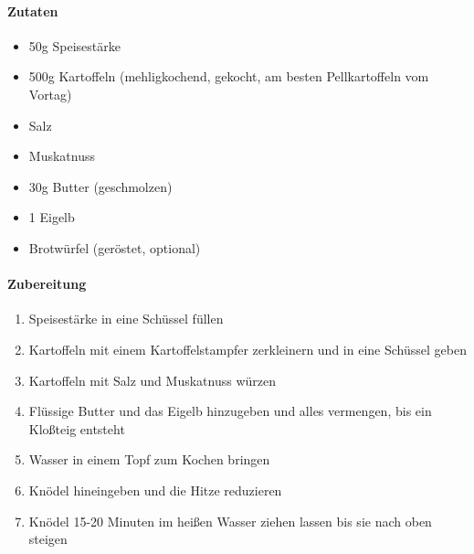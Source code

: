 \newpage
{}

\paragraph{Zutaten}
\begin{itemize}[noitemsep]
	\item  50g Speisestärke
	\item 500g Kartoffeln (mehligkochend, gekocht, am besten Pellkartoffeln vom Vortag)
	\item Salz
	\item Muskatnuss
	\item 30g Butter (geschmolzen)
	\item 1 Eigelb
	\item Brotwürfel (geröstet, optional)
\end{itemize}

\paragraph{Zubereitung}
\begin{enumerate}[noitemsep]
	\item Speisestärke in eine Schüssel füllen
	\item Kartoffeln mit einem Kartoffelstampfer zerkleinern und in eine Schüssel geben
	\item Kartoffeln mit Salz und Muskatnuss würzen
	\item Flüssige Butter und das Eigelb hinzugeben und alles vermengen, bis ein Kloßteig entsteht
	\item Wasser in einem Topf zum Kochen bringen
	\item Knödel hineingeben und die Hitze reduzieren
	\item Knödel 15-20 Minuten im heißen Wasser ziehen lassen bis sie nach oben steigen
\end{enumerate}